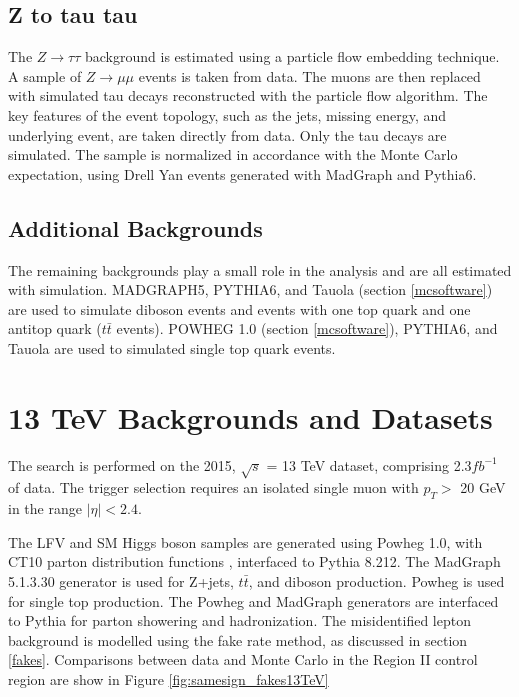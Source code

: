 \documentclass[oneside, letterpaper, oldfontcommands]{memoir}
\begin{document}
\subsection{Z to tau tau}
\qquad The $Z \rightarrow \tau\tau$ background is estimated using a particle flow embedding technique\cite{CMS-PAS-HIG-12-018}. A sample of $Z \rightarrow \mu\mu$ events is taken from data. The muons are then replaced with simulated tau decays reconstructed with the particle flow algorithm. The key features of the event topology, such as the jets, missing energy, and underlying event, are taken directly from data. Only the tau decays are simulated. The sample is normalized in accordance with the Monte Carlo expectation, using Drell Yan events generated with {\sc MadGraph}\cite{Alwall:2011uj} and {\sc Pythia}6\cite{Sjostrand:2006za}.

\subsection{Additional Backgrounds}\label{addback}
\qquad The remaining backgrounds play a small role in the analysis and are all estimated with simulation. MADGRAPH5, PYTHIA6, and Tauola (section \ref{mcsoftware}) are used to simulate diboson events and events with one top quark and one antitop quark ($t\bar{t}$ events). POWHEG 1.0 (section \ref{mcsoftware}), PYTHIA6, and Tauola are used to simulated single top quark events.

\section{13 TeV Backgrounds and Datasets}

\qquad The search is performed on the 2015, $\sqrt{s}$ = 13 TeV dataset, comprising 2.3$fb^{-1}$ of data. The trigger selection requires an isolated single muon with $p_{T} >$ 20 GeV in the range $|\eta| < 2.4$.

\qquad The LFV and SM Higgs boson samples are generated using {\sc Powheg} 1.0, with CT10 parton distribution functions \cite{Guzzi:2011sv}, interfaced to {\sc Pythia} 8.212\cite{Sjostrand:2014zea}. The {\sc MadGraph} 5.1.3.30 \cite{Alwall:2011uj} generator is used for Z+jets, $t\bar{t}$, and diboson production. {\sc Powheg} is used for single top production. The {\sc Powheg} and {\sc MadGraph} generators are interfaced to {\sc Pythia} for parton showering and hadronization. The misidentified lepton background is modelled using the fake rate method, as discussed in section \ref{fakes}. Comparisons between data and Monte Carlo in the Region II control region are show in Figure \ref{fig:samesign_fakes13TeV} 
\end{document}
